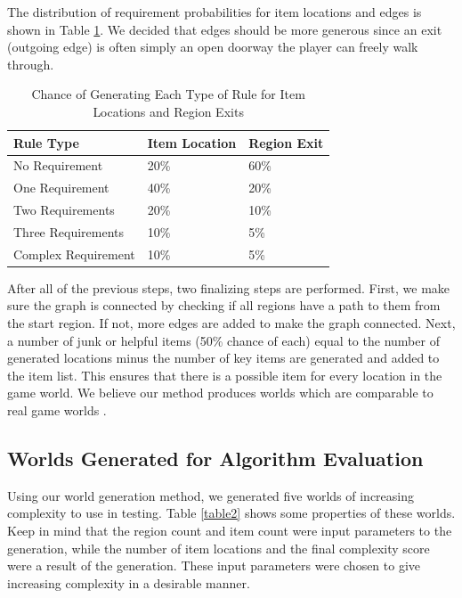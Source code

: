 \documentclass{ieeeaccess}
\begin{document}
The distribution of requirement probabilities for item locations and edges is shown in Table
\ref{table1}. We decided that edges should be more generous since an exit (outgoing edge) is
often simply an open doorway the player can freely walk through.

\begin{table}
\caption{Chance of Generating Each Type of Rule for Item Locations and Region Exits}
\label{table1}
\setlength{\tabcolsep}{3pt}
\renewcommand{\arraystretch}{1.2}
\begin{tabular}{ |p{100pt}|p{60pt}|p{60pt}|  }
 \hline
 Rule Type & Item Location & Region Exit \\
 \hline
 No Requirement & 20\% & 60\% \\
 \hline
 One Requirement & 40\% & 20\% \\
 \hline
 Two Requirements & 20\% & 10\% \\
 \hline
 Three Requirements & 10\% & 5\% \\
 \hline
 Complex Requirement & 10\% & 5\% \\
 \hline
\end{tabular}
\end{table}

After all of the previous steps, two finalizing steps are performed. First, we make sure the
graph is connected by checking if all regions have a path to them from the start region. If
not, more edges are added to make the graph connected. Next, a number of junk or helpful items
(50\% chance of each) equal to the number of generated locations minus the number of key items
are generated and added to the item list. This ensures that there is a possible item for every
location in the game world. We believe our method produces worlds which are comparable to 
real game worlds \cite{b1}.

\subsection{Worlds Generated for Algorithm Evaluation}
Using our world generation method, we generated five worlds of increasing complexity to use in
testing. Table \ref{table2} shows some properties of these worlds. Keep in mind that the region
count and item count were input parameters to the generation, while the number of item
locations and the final complexity score were a result of the generation. These input
parameters were chosen to give increasing complexity in a desirable manner.
\end{document}
